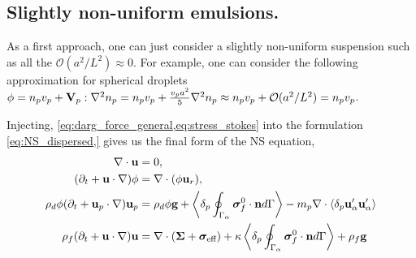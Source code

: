 \subsection{Slightly non-uniform emulsions.}

As a first approach, one can just consider a slightly non-uniform suspension such as all the $\mathcal{O}(a^2/L^2) \approx 0$.  
For example, one can consider the following approximation for spherical droplets $\phi = n_pv_p + \textbf{V}_p :\mathbf{\nabla}^2 n_p = n_pv_p + \frac{v_p a^2}{5}\mathbf{\nabla}^2 n_p \approx n_pv_p + \mathcal{O}(a^2/L^2) = n_pv_p$.

Injecting, \ref{eq:darg_force_general,eq:stress_stokes} into the formulation \ref{eq:NS_dispersed,} gives us the final form of the NS equation, 
\begin{align}
    \div\textbf{u}&=0, \\
    (\pddt + \textbf{u}\cdot \grad)\phi &= \div(\phi \textbf{u}_r), \\
    \rho_d\phi (\pddt + \textbf{u}_p \cdot \grad)  \textbf{u}_p
    &= 
    \rho_d \phi \textbf{g}
    + 
        \pSavg{\bm\sigma_f^0 \cdot \textbf{n}}
        - m_p \div \pavg{\textbf{u}_\alpha'\textbf{u}_\alpha'}
    \\
    \rho_f (\pddt 
    + \textbf{u}\cdot \grad)
    \textbf{u}
    &= 
    \div (\bm\Sigma
    +  \bm{\sigma}_\text{eff} )
    + \kappa \pSavg{ \bm{\sigma}_f^0 \cdot \textbf{n}} 
    + \rho_f \textbf{g} 
    \label{eq:dtu_bulk}
\end{align}
